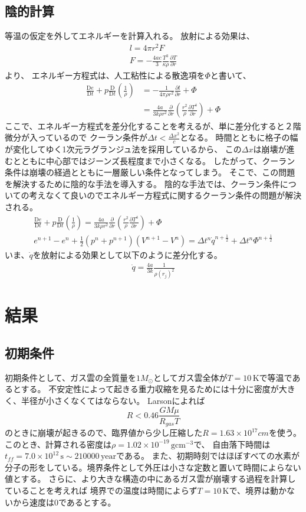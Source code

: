 \documentclass[a4j, dvipdfmx]{jsarticle}
\newcommand{\pder}[2][]{\frac{\partial#1}{\partial#2}}
\newcommand{\Dder}[2][]{\frac{\mathrm{D}#1}{\mathrm{D}#2}}
\newcommand{\half}{\frac{1}{2}}
\newcommand{\beq}{\begin{equation}}
\newcommand{\eeq}{\end{equation}}
\begin{document}
\subsection{陰的計算}
等温の仮定を外してエネルギーを計算入れる。
放射による効果は、
\begin{align}
    l = 4\pi r^2 F\\
    F = - \frac{4ac}{3} \frac{T^3}{\kappa \rho}\pder[T]{r}
\end{align}
より、
エネルギー方程式は、人工粘性による散逸項を$\Phi$と書いて、
\begin{align}
    \Dder[e]{t} + p \Dder[]{t}\left(\frac{1}{\rho}\right) &= - \frac{1}{4\pi\rho r^2}\pder[l]{r} + \Phi\\
                                                          &= 
                                                          \frac{4a}{3k\rho r^2}\pder[]{r}\left(\frac{r^2}{\rho} \pder[T^4]{r} \right) + \Phi
\end{align}    
ここで、エネルギー方程式を差分化することを考えるが、単に差分化すると２階微分が入っているので
クーラン条件が$\Delta t < \frac{\Delta x^2}{c}$となる。
時間とともに格子の幅が変化してゆく1次元ラグランジュ法を採用しているから、
この$\Delta x$は崩壊が進むとともに中心部ではジーンズ長程度まで小さくなる。
したがって、クーラン条件は崩壊の経過とともに一層厳しい条件となってしまう。
そこで、この問題を解決するために陰的な手法を導入する。
陰的な手法では、クーラン条件についての考えなくて良いのでエネルギー方程式に関するクーラン条件の問題が解決される。
\begin{align}
    \Dder[e]{t} + p \Dder[]{t}\left(\frac{1}{\rho}\right) 
= \frac{4a}{3k\rho r^2}\pder[]{r}\left(\frac{r^2}{\rho} \pder[T^4]{r} \right) + \Phi\\
e^{n+1} - e^{n} + \half (p^n + p^{n+1})(V^{n+1} - V^n) = \Delta t^n \dot{q}^{n+\half}+\Delta t^n \Phi^{n+\half}
\end{align}    
いま、$\dot{q}$を放射による効果として以下のように差分化する。
\begin{align}
    \dot{q} = \frac{4a}{3k}\frac{1}{\rho (r_j)^2}
\end{align}


\section{結果}
\subsection{初期条件}
初期条件として、ガス雲の全質量を$1M_\odot$としてガス雲全体が$T=10\,\mathrm{K}$で等温であるとする。
不安定性によって起きる重力収縮を見るためには十分に密度が大きく、半径が小さくなくてはならない。
Larson\cite{Larson}によれば
\beq
R < 0.46 \frac{GM\mu}{R_{gas}T}
\eeq
のときに崩壊が起きるので、臨界値から少し圧縮した$R = 1.63 \times 10^{17}cm$を使う。
このとき、計算される密度は$\rho = 1.02 \times 10^{-19}\,\mathrm{gcm^{-3}}$で、
自由落下時間は$t_{ff} = 7.0 \times 10^{12} \,\mathrm{s} \sim 210000 \,\mathrm{year}$である。
また、初期時刻ではほぼすべての水素が分子の形をしている。境界条件として外圧は小さな定数と置いて時間によらない値とする。
さらに、より大きな構造の中にあるガス雲が崩壊する過程を計算していることを考えれば
境界での温度は時間によらず$T=10\,\mathrm{K}$で、境界は動かないから速度は$0$であるとする。
\end{document}
